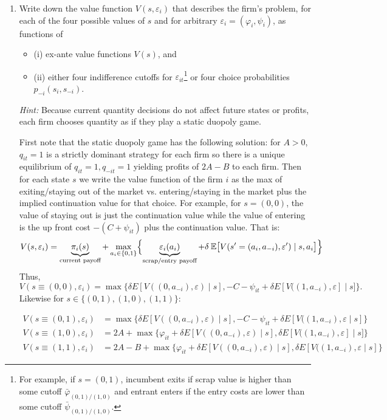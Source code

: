 \documentclass{article}
\begin{document}
\begin{enumerate}
    \item Write down the value function $V(s, \varepsilon_i)$ that describes the firm’s problem, for each of the four possible values of $s$ and for arbitrary $\varepsilon_i = (\varphi_i, \psi_i)$, as functions of
    \begin{itemize}
        \item (i) ex-ante value functions $V(s)$, and
        \item (ii) either four indifference cutoffs for $\varepsilon_{it}$\footnote{For example, if $s = (0,1)$, incumbent exits if scrap value is higher than some cutoff $\bar{\varphi}_{(0,1)/(1,0)}$ and entrant enters if the entry costs are lower than some cutoff $\bar{\psi}_{(0,1)/(1,0)}$.}
        or four choice probabilities $p_{-i}(s_i, s_{-i})$.
    \end{itemize}

    \textit{Hint:} Because current quantity decisions do not affect future states or profits, each firm chooses quantity as if they play a static duopoly game.

\begin{answer}
First note that the static duopoly game has the following solution: for $A>0$, $q_{it}=1$ is a strictly dominant strategy for each firm so there is a unique equilibrium of $q_{it}=1,q_{-it}=1$ yielding profits of $2A-B$ to each firm.
Then for each state $s$ we write the value function of the firm $i$ as the max of exiting/staying out of the market vs. entering/staying in the market plus the implied continuation value for that choice. For example, for $s = (0,0)$, the value of staying out is just the continuation value while the value of entering is the up front cost $-(C + \psi_{it})$ plus the continuation value. That is:
\[
  V(s,\varepsilon_i)
  = \underbrace{\pi_i(s)}_{\text{current payoff}} + \max_{a_i\in\{0,1\}}
    \Bigl\{
\underbrace{\varepsilon_i(a_i)}_{\text{scrap/entry payoff}}
+\delta \: \mathbb{E}\bigl[V(s'=(a_i,a_{-i}),\varepsilon')\mid s,a_i\bigr]\Bigr\}
\]
Thus, 
\begin{equation*}
    V(s \equiv (0,0),\varepsilon_i) = \max \{ \delta E[ V((0,a_{{-i}}),\varepsilon)\mid s],  -C - \psi_{it} +\delta E[ V((1,a_{{-i}}),\varepsilon] \mid s]\}.
\end{equation*}
Likewise for $s \in \{(0,1), (1,0), (1,1)\}$:

 \begin{align*}
 V(s \equiv (0,1),\varepsilon_i) & = \max \{  \delta E[ V((0,a_{{-i}}),\varepsilon) \mid s], -C- \psi_{it} + \delta E[ V((1,a_{{-i}}),\varepsilon \mid s] \} \\
 V(s \equiv (1,0),\varepsilon_i) & =2A +  \max \{ \varphi_{it}+ \delta E[ V((0,a_{{-i}}),\varepsilon) \mid s], \delta E[ V((1,a_{{-i}}),\varepsilon] \mid s]\} \\
 V(s \equiv (1,1),\varepsilon_i) & = 2A-B +\max \{\varphi_{it} + \delta E[ V((0,a_{{-i}}),\varepsilon) \mid s], \delta E[ V((1,a_{{-i}}),\varepsilon \mid s] \} 
\end{align*}


\end{answer}
\end{enumerate}
\end{document}
